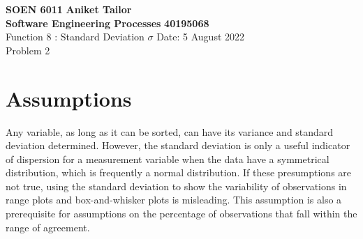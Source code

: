 \documentclass[a4paper, 12pt]{article}
\begin{document}
\noindent
\large\textbf{SOEN 6011} \hfill \textbf{Aniket Tailor}\\
\large\textbf{Software Engineering Processes} \hfill \textbf{40195068} \\
Function 8 : Standard Deviation $\sigma$ \hfill Date: 5 August 2022\\
\normalsize Problem 2 \\
\section*{Assumptions}
Any variable, as long as it can be sorted, can have its variance and standard deviation determined. However, the standard deviation is only a useful indicator of dispersion for a measurement variable when the data have a symmetrical distribution, which is frequently a normal distribution. If these presumptions are not true, using the standard deviation to show the variability of observations in range plots and box-and-whisker plots is misleading. This assumption is also a prerequisite for assumptions on the percentage of observations that fall within the range of agreement.
\end{document}
